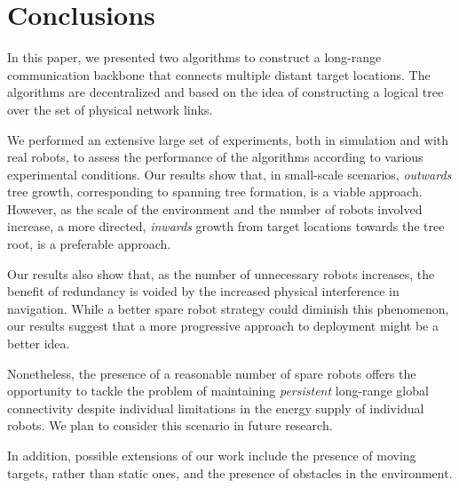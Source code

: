 \section{Conclusions}
\label{sec:conclusions}

In this paper, we presented two algorithms to construct a long-range
communication backbone that connects multiple distant target
locations. The algorithms are decentralized and based on the idea of
constructing a logical tree over the set of physical network links.

We performed an extensive large set of experiments, both in simulation
and with real robots, to assess the performance of the algorithms
according to various experimental conditions. Our results show that,
in small-scale scenarios, \emph{outwards} tree growth, corresponding
to spanning tree formation, is a viable approach. However, as the
scale of the environment and the number of robots involved increase, a
more directed, \emph{inwards} growth from target locations towards the
tree root, is a preferable approach.

Our results also show that, as the number of unnecessary robots
increases, the benefit of redundancy is voided by the increased
physical interference in navigation. While a better spare robot
strategy could diminish this phenomenon, our results suggest that a
more progressive approach to deployment might be a better idea.

Nonetheless, the presence of a reasonable number of spare robots
offers the opportunity to tackle the problem of maintaining
\emph{persistent} long-range global connectivity despite individual
limitations in the energy supply of individual robots. We plan to
consider this scenario in future research.

In addition, possible extensions of our work include the presence of
moving targets, rather than static ones, and the presence of obstacles
in the environment.

